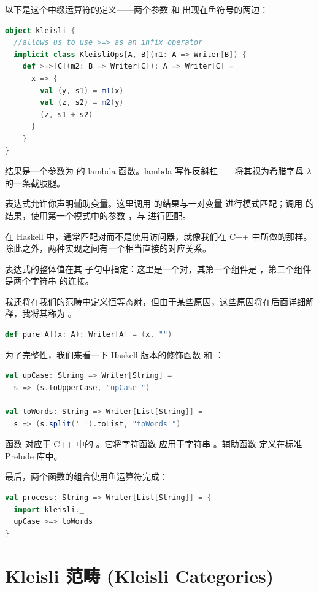 以下是这个中缀运算符的定义——两个参数  和  出现在鱼符号的两边：

\begin{lstlisting}[language=Scala]
object kleisli {
  //allows us to use >=> as an infix operator
  implicit class KleisliOps[A, B](m1: A => Writer[B]) {
    def >=>[C](m2: B => Writer[C]): A => Writer[C] =
      x => {
        val (y, s1) = m1(x)
        val (z, s2) = m2(y)
        (z, s1 + s2)
      }
    }
}
\end{lstlisting}
结果是一个参数为  的 lambda 函数。lambda 写作反斜杠——将其视为希腊字母 $\lambda$ 的一条截肢腿。

 表达式允许你声明辅助变量。这里调用  的结果与一对变量  进行模式匹配；调用  的结果，使用第一个模式中的参数 ，与  进行匹配。

在 Haskell 中，通常匹配对而不是使用访问器，就像我们在 C++ 中所做的那样。除此之外，两种实现之间有一个相当直接的对应关系。

 表达式的整体值在其  子句中指定：这里是一个对，其第一个组件是 ，第二个组件是两个字符串  的连接。

我还将在我们的范畴中定义恒等态射，但由于某些原因，这些原因将在后面详细解释，我将其称为 。

\begin{lstlisting}[language=Scala]
def pure[A](x: A): Writer[A] = (x, "")
\end{lstlisting}
为了完整性，我们来看一下 Haskell 版本的修饰函数  和 ：

\begin{lstlisting}[language=Scala]
val upCase: String => Writer[String] =
  s => (s.toUpperCase, "upCase ")

val toWords: String => Writer[List[String]] =
  s => (s.split(' ').toList, "toWords ")
\end{lstlisting}
函数  对应于 C++ 中的 。它将字符函数  应用于字符串 。辅助函数  定义在标准 Prelude 库中。

最后，两个函数的组合使用鱼运算符完成：

\begin{lstlisting}[language=Scala]
val process: String => Writer[List[String]] = {
  import kleisli._
  upCase >=> toWords
}
\end{lstlisting}

\section{Kleisli 范畴 (Kleisli Categories)}

